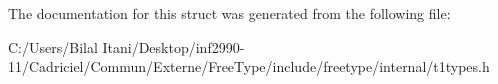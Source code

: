 The documentation for this struct was generated from the following file\+:\begin{DoxyCompactItemize}
\item 
C\+:/\+Users/\+Bilal Itani/\+Desktop/inf2990-\/11/\+Cadriciel/\+Commun/\+Externe/\+Free\+Type/include/freetype/internal/t1types.\+h\end{DoxyCompactItemize}

